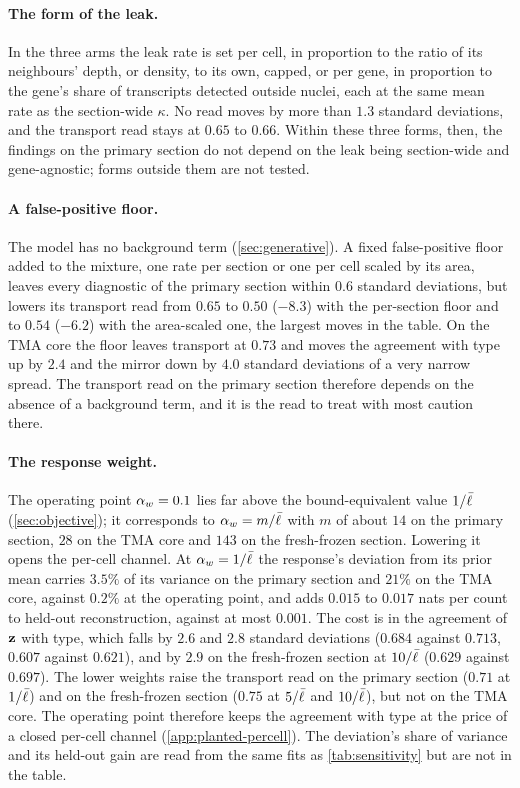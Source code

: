 \paragraph{The form of the leak.} In the three arms the leak rate is set per cell, in proportion to the ratio of its neighbours' depth, or density, to its own, capped, or per gene, in proportion to the gene's share of transcripts detected outside nuclei, each at the same mean rate as the section-wide $\kappa$. No read moves by more than $1.3$ standard deviations, and the transport read stays at $0.65$ to $0.66$. Within these three forms, then, the findings on the primary section do not depend on the leak being section-wide and gene-agnostic; forms outside them are not tested.

\paragraph{A false-positive floor.} The model has no background term (\cref{sec:generative}). A fixed false-positive floor added to the mixture, one rate per section or one per cell scaled by its area, leaves every diagnostic of the primary section within $0.6$ standard deviations, but lowers its transport read from $0.65$ to $0.50$ ($-8.3$) with the per-section floor and to $0.54$ ($-6.2$) with the area-scaled one, the largest moves in the table. On the TMA core the floor leaves transport at $0.73$ and moves the agreement with type up by $2.4$ and the mirror down by $4.0$ standard deviations of a very narrow spread. The transport read on the primary section therefore depends on the absence of a background term, and it is the read to treat with most caution there.

\paragraph{The response weight.} The operating point $\alpha_w = 0.1$ lies far above the bound-equivalent value $1/\bar{\ell}$ (\cref{sec:objective}); it corresponds to $\alpha_w = m/\bar{\ell}$ with $m$ of about $14$ on the primary section, $28$ on the TMA core and $143$ on the fresh-frozen section. Lowering it opens the per-cell channel. At $\alpha_w = 1/\bar{\ell}$ the response's deviation from its prior mean carries $3.5\%$ of its variance on the primary section and $21\%$ on the TMA core, against $0.2\%$ at the operating point, and adds $0.015$ to $0.017$ nats per count to held-out reconstruction, against at most $0.001$. The cost is in the agreement of $\mathbf{z}$ with type, which falls by $2.6$ and $2.8$ standard deviations ($0.684$ against $0.713$, $0.607$ against $0.621$), and by $2.9$ on the fresh-frozen section at $10/\bar{\ell}$ ($0.629$ against $0.697$). The lower weights raise the transport read on the primary section ($0.71$ at $1/\bar{\ell}$) and on the fresh-frozen section ($0.75$ at $5/\bar{\ell}$ and $10/\bar{\ell}$), but not on the TMA core. The operating point therefore keeps the agreement with type at the price of a closed per-cell channel (\cref{app:planted-percell}). The deviation's share of variance and its held-out gain are read from the same fits as \cref{tab:sensitivity} but are not in the table.

